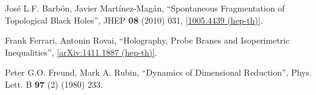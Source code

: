 \documentclass[12pt]{article}
\newcommand{\2}{$^2$}
\newcommand{\3}{$^3$}
\newcommand{\4}{$_4$}
\newcommand{\5}{$_5$}
\begin{document}
\begin{thebibliography}{400}
 Jos\'e L.F. Barb\'on, Javier Mart\'inez-Mag\'an, ``Spontaneous Fragmentation of Topological Black Holes'', JHEP \textbf{08} (2010) 031, \href{http://arxiv.org/abs/1005.4439}{[1005.4439 (hep-th)]}.

Frank Ferrari, Antonin Rovai, ``Holography, Probe Branes and Isoperimetric Inequalities'', \href{http://arxiv.org/abs/1411.1887}{[arXiv:1411.1887 (hep-th)]}.

Peter G.O. Freund, Mark A. Rubin, ``Dynamics of Dimensional Reduction'', Phys. Lett. B \textbf{97} (2) (1980) 233.



\end{thebibliography}
\end{document}
